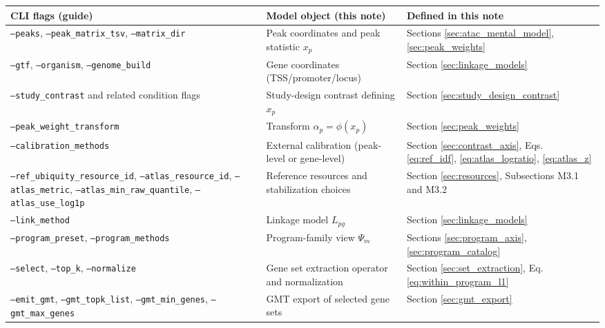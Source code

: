 \documentclass[11pt]{article}
\begin{document}
\begin{longtable}{p{} p{} p{}}
\toprule
CLI flags (guide) & Model object (this note) & Defined in this note \\
\midrule
\texttt{--peaks}, \texttt{--peak\_matrix\_tsv}, \texttt{--matrix\_dir} & Peak coordinates and peak statistic $x_p$ & Sections \ref{sec:atac_mental_model}, \ref{sec:peak_weights} \\
\texttt{--gtf}, \texttt{--organism}, \texttt{--genome\_build} & Gene coordinates (TSS/promoter/locus) & Section \ref{sec:linkage_models} \\
\texttt{--study\_contrast} and related condition flags & Study-design contrast defining $x_p$ & Section \ref{sec:study_design_contrast} \\
\texttt{--peak\_weight\_transform} & Transform $\alpha_p=\phi(x_p)$ & Section \ref{sec:peak_weights} \\
\texttt{--calibration\_methods} & External calibration (peak-level or gene-level) & Section \ref{sec:contrast_axis}, Eqs. \ref{eq:ref_idf}, \ref{eq:atlas_logratio}, \ref{eq:atlas_z} \\
\texttt{--ref\_ubiquity\_resource\_id}, \texttt{--atlas\_resource\_id}, \texttt{--atlas\_metric}, \texttt{--atlas\_min\_raw\_quantile}, \texttt{--atlas\_use\_log1p} & Reference resources and stabilization choices & Section \ref{sec:resources}, Subsections M3.1 and M3.2 \\
\texttt{--link\_method} & Linkage model $L_{pg}$ & Section \ref{sec:linkage_models} \\
\texttt{--program\_preset}, \texttt{--program\_methods} & Program-family view $\Psi_m$ & Sections \ref{sec:program_axis}, \ref{sec:program_catalog} \\
\texttt{--select}, \texttt{--top\_k}, \texttt{--normalize} & Gene set extraction operator and normalization & Section \ref{sec:set_extraction}, Eq. \ref{eq:within_program_l1} \\
\texttt{--emit\_gmt}, \texttt{--gmt\_topk\_list}, \texttt{--gmt\_min\_genes}, \texttt{--gmt\_max\_genes} & GMT export of selected gene sets & Section \ref{sec:gmt_export} \\
\bottomrule
\end{longtable}
\end{document}
